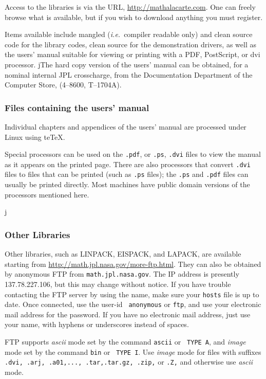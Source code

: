 \documentclass[twoside]{MATH77}
\begin{document}
Access to the libraries is via the URL, \url{http://mathalacarte.com}.  One
can freely browse what is available, but if you wish to download anything you
must register.

Items available include mangled ({\em i.e.}\ compiler readable only) and clean
source code for the library codes, clean source for the demonstration drivers,
as well as the users' manual suitable for viewing or printing with a PDF,
PostScript, or dvi processor.  \if j\outtyp The hard copy version of the
users' manual can be obtained, for a nominal internal JPL crosscharge, from
the Documentation Department of the Computer Store, (4--8600, T--1704A).  \fi

\subsubsection{Files containing the users' manual}

Individual chapters and appendices of the users' manual are processed under
Linux using te\TeX.

Special processors can be used on the {\tt .pdf}, or {\tt .ps}, {\tt .dvi}
files to view the manual as it appears on the printed page.  There are also
processors that convert {\tt .dvi} files to files that can be printed (such as
{\tt .ps} files); the {\tt .ps} and {\tt .pdf} files can usually be printed
directly.  Most machines have public domain versions of the processors
mentioned here.

\if j\outtyp
\subsubsection{Other Libraries}

Other libraries, such as LINPACK, EISPACK, and LAPACK, are available
starting from \url{http://math.jpl.nasa.gov/more-ftp.html}.  They can also
be obtained by anonymous FTP from {\tt math.jpl.nasa.gov}.  The IP address
is presently 137.78.227.106, but this may change without notice.  If you
have trouble contacting the FTP server by using the name, make sure your
{\tt hosts} file is up to date.  Once connected, use the user-id {\tt
anonymous} or {\tt ftp}, and use your electronic mail address for the
password.  If you have no electronic mail address, just use your name,
with hyphens or underscores instead of spaces.

FTP supports {\em ascii} mode set by the command {\tt ascii} or {\tt
TYPE~A}, and {\em image} mode set by the command {\tt bin} or {\tt
TYPE~I}. Use {\em image} mode for files with suffixes {\tt .dvi,
.arj, .a01,..., .tar,.tar.gz, .zip,} or {\tt .Z,} and otherwise use {\em
ascii} mode.
\end{document}
